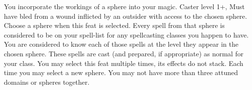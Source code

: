  {}
\descfeat
{You incorporate the workings of a sphere into your magic.}
{Caster level 1+, Must have bled from a wound inflicted by an outsider with access to the chosen sphere.}
{Choose a sphere when this feat is selected. Every spell from that sphere is considered to be on your spell-list for any spellcasting classes you happen to have. You are considered to know each of those spells at the level they appear in the chosen sphere. These spells are cast (and prepared, if appropriate) as normal for your class.}
{You may select this feat multiple times, its effects do not stack. Each time you may select a new sphere. You may not have more than three attuned domains or spheres together.}